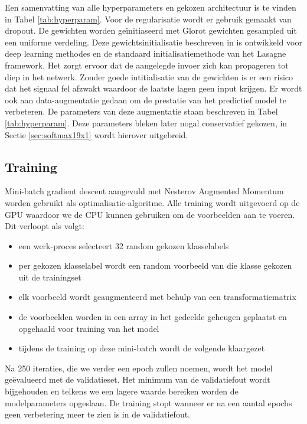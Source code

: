 \npar Een samenvatting van alle hyperparameters en gekozen architectuur is te vinden in Tabel \ref{tab:hyperparam}. Voor de regularisatie wordt er gebruik gemaakt van dropout. De gewichten worden ge\"initiaseerd met Glorot gewichten gesampled uit een uniforme verdeling. Deze gewichtsinitialisatie beschreven in \cite{glorot-1} is ontwikkeld voor deep learning methodes en de standaard initialisatiemethode van het Lasagne framework. Het zorgt ervoor dat de aangelegde invoer zich kan propageren tot diep in het netwerk. Zonder goede intitialisatie van de gewichten is er een risico dat het signaal fel afzwakt waardoor de laatste lagen geen input krijgen.
\npar Er wordt ook aan data-augmentatie gedaan om de prestatie van het predictief model te verbeteren. De parameters van deze augmentatie staan beschreven in Tabel \ref{tab:hyperparam}. Deze parameters bleken later nogal conservatief gekozen, in Sectie \ref{sec:softmax19x1} wordt hierover uitgebreid.
\subsection{Training}
\npar Mini-batch gradient descent aangevuld met Nesterov Augmented Momentum worden gebruikt als optimalisatie-algoritme. Alle training wordt uitgevoerd op de GPU waardoor we de CPU kunnen gebruiken om de voorbeelden aan te voeren. Dit verloopt als volgt:
\begin{itemize}
	\item een werk-proces selecteert 32 random gekozen klasselabels
	\item per gekozen klasselabel wordt een random voorbeeld van die klasse gekozen uit de trainingset
	\item elk voorbeeld wordt geaugmenteerd met behulp van een transformatiematrix
	\item de voorbeelden worden in een array in het gedeelde geheugen geplaatst en opgehaald voor training van het model
	\item tijdens de training op deze mini-batch wordt de volgende klaargezet
\end{itemize}
Na 250 iteraties, die we verder een epoch zullen noemen, wordt het model ge\"evalueerd met de validatieset. Het minimum van de validatiefout wordt bijgehouden en telkens we een lagere waarde bereiken worden de modelparameters opgeslaan. De training stopt wanneer er na een aantal epochs geen verbetering meer te zien is in de validatiefout.

